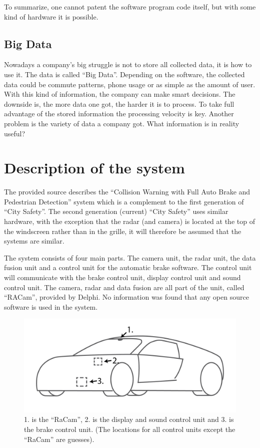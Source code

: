 \documentclass[conference]{IEEEtran}
\begin{document}
To summarize, one cannot patent the software program code itself, but with some kind of hardware it is possible.
\subsection{Big Data}
Nowadays a company's big struggle is not to store all collected data, it is how to use it. The data is called ``Big Data''. \cite{ExploitBigData} Depending on the software, the collected data could be commute patterns, phone usage or as simple as the amount of user. With this kind of information, the company can make smart decisions. The downside is, the more data one got, the harder it is to process. To take full advantage of the stored information the processing velocity is key. Another problem is the variety of data a company got. What information is in reality useful? \cite{SpeedDataEco} 


\section{Description of the system}
The provided source describes the ``Collision Warning with Full Auto Brake and Pedestrian Detection'' system which is a complement to the first generation of ``City Safety''. The second generation (current) ``City Safety'' uses similar hardware, with the exception that the radar (and camera) is located at the top of the windscreen rather than in the grille, it will therefore be assumed that the systems are similar. \cite{SysDescription,RACam,DelphiVolvo}

The system consists of four main parts. The camera unit, the radar unit, the data fusion unit and a control unit for the automatic brake software. The control unit will communicate with the brake control unit, display control unit and sound control unit. The camera, radar and data fusion are all part of the unit, called ``RACam'', provided by Delphi. \cite{SysDescription,DelphiVolvo} No information was found that any open source software is used in the system.

\begin{figure}
	\includegraphics[scale=0.25]{overview.png}
	\caption{1. is the ``RaCam'', 2. is the display and sound control unit and 3. is the brake control unit. (The locations for all control units except the ``RaCam'' are guesses).}
\end{figure}
\end{document}
